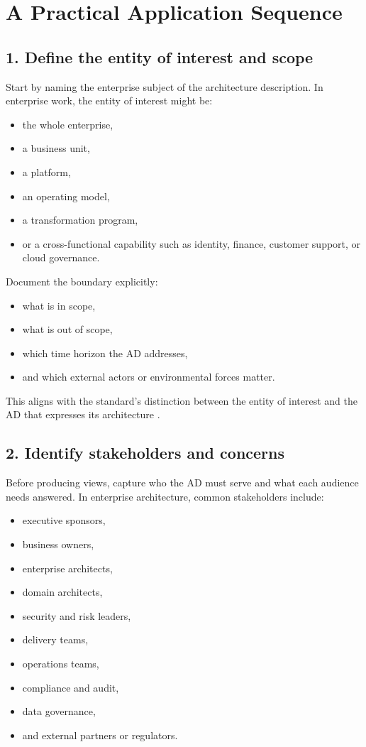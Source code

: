 \documentclass[11pt]{article}
\begin{document}
\section*{A Practical Application Sequence}

\subsection*{1. Define the entity of interest and scope}
Start by naming the enterprise subject of the architecture description. In enterprise work, the entity of interest might be:
\begin{itemize}
    \item the whole enterprise,
    \item a business unit,
    \item a platform,
    \item an operating model,
    \item a transformation program,
    \item or a cross-functional capability such as identity, finance, customer support, or cloud governance.
\end{itemize}

Document the boundary explicitly:
\begin{itemize}
    \item what is in scope,
    \item what is out of scope,
    \item which time horizon the AD addresses,
    \item and which external actors or environmental forces matter.
\end{itemize}

This aligns with the standard's distinction between the entity of interest and the AD that expresses its architecture \cite{iso42010}.

\subsection*{2. Identify stakeholders and concerns}
Before producing views, capture who the AD must serve and what each audience needs answered. In enterprise architecture, common stakeholders include:
\begin{itemize}
    \item executive sponsors,
    \item business owners,
    \item enterprise architects,
    \item domain architects,
    \item security and risk leaders,
    \item delivery teams,
    \item operations teams,
    \item compliance and audit,
    \item data governance,
    \item and external partners or regulators.
\end{itemize}
\end{document}
